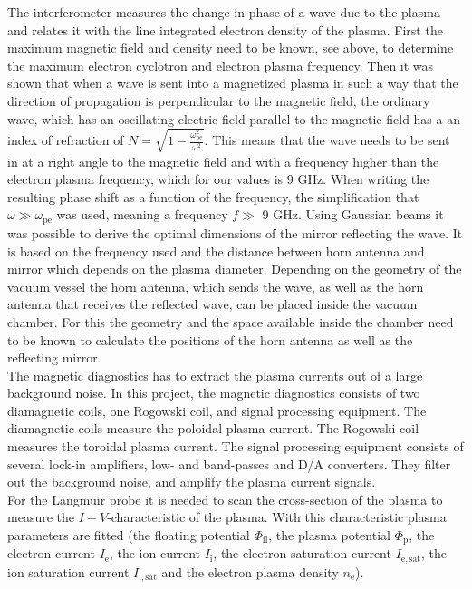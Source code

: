 The interferometer measures the change in phase of a wave due to the plasma and relates it with the line integrated electron density of the plasma. First the maximum magnetic field and density need to be known, see above, to determine the maximum electron cyclotron and electron plasma frequency. Then it was shown that when a wave is sent into a magnetized plasma in such a way that the direction of propagation is perpendicular to the magnetic field, the ordinary wave, which has an oscillating electric field parallel to the magnetic field has a an index of refraction of $N = \sqrt{1 - \frac{\omega_\mathrm{pe}^2}{\omega^2 }}$. This means that the wave needs to be sent in at a right angle to the magnetic field and with a frequency higher than the electron plasma frequency, which for our values is $9$ GHz. When writing the resulting phase shift as a function of the frequency, the simplification that $\omega \gg \omega_\mathrm{pe}$ was used, meaning a frequency $f \gg$ 9 GHz. Using Gaussian beams it was possible to derive the optimal dimensions of the mirror reflecting the wave. It is based on the frequency used and the distance between horn antenna and mirror which depends on the plasma diameter. Depending on the geometry of the vacuum vessel the horn antenna, which sends the wave, as well as the horn antenna that receives the reflected wave, can be placed inside the vacuum chamber. For this the geometry and the space available inside the chamber need to be known to calculate the positions of the horn antenna as well as the reflecting mirror. \\

The magnetic diagnostics has to extract the plasma currents out of a large background noise. In this project, the magnetic diagnostics consists of two diamagnetic coils, one Rogowski coil, and signal processing equipment. 
The diamagnetic coils measure the poloidal plasma current. 
The Rogowski coil measures the toroidal plasma current. 
The signal processing
equipment consists of several lock-in amplifiers, low- and band-passes and D/A converters. They filter out the background noise, and amplify the plasma current signals. \\

For the Langmuir probe it is needed to scan the cross-section of the plasma to measure the $I-V$-characteristic of the plasma. With this characteristic plasma parameters are fitted (the floating potential $\Phi_\mathrm{fl}$, the plasma potential $\Phi_\mathrm{p}$, the electron current $I_\mathrm{e}$, the ion current $I_\mathrm{i}$, the electron saturation current $I_\mathrm{e,sat}$, the ion saturation current $I_\mathrm{i,sat}$ and the electron plasma density $n_\mathrm{e}$).

